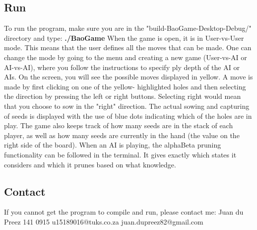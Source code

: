 \documentclass[a4paper]{article}
\begin{document}
	\subsection{Run}
	To run the program, make sure you are in the "build-BaoGame-Desktop-Debug/" directory
	and type: \newline
	\newline	
	\textbf{./BaoGame}
	\newline	
	\newline
	When the game is open, it is in User-vs-User mode. This means that the user defines all the moves that can be made. One can 		change the mode by going to the menu and creating a new game (User-vs-AI or AI-vs-AI), where you follow the instructions to 		specify ply depth of the AI or AIs.	
	\newline	
	\newline
	On the 	screen, you will see the possible moves displayed in yellow. A move is made by first clicking on one of the yellow-			highlighted holes and then selecting the direction by pressing the left or right buttons. Selecting right would mean that 			you choose to sow in the "right" direction. The actual sowing and capturing of seeds is displayed with the use of blue dots 		indicating which of the holes are in play.
	\newline	
	\newline
	The game also keeps track of how many seeds are in the stack of each player, as well as how many seeds are currently in the 			hand (the value on the right side of the board).
	\newline	
	\newline
	When an AI is playing, the alphaBeta pruning functionality can be followed in the terminal. It gives exactly which states it 	considers and which it prunes based on what knowledge.
	
	
	\subsection{Contact}
	If you cannot get the program to compile and run, please contact me: \newline
	Juan du Preez 141 0915\newline
	u15189016@tuks.co.za\newline
	juan.dupreez82@gmail.com
	
\end{document}
